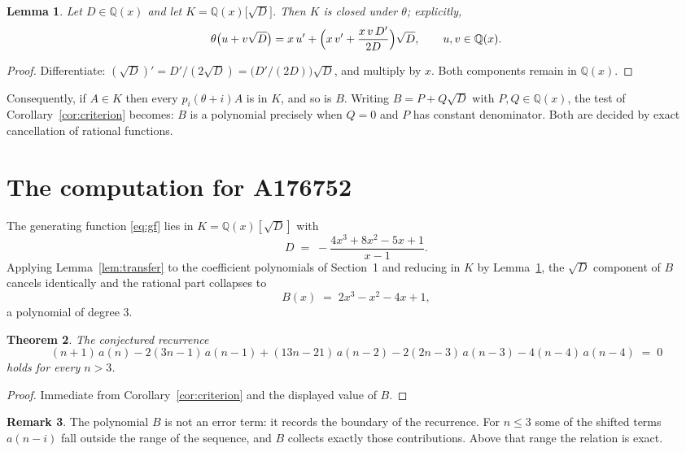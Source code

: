 \documentclass[11pt,a4paper]{article}
\theoremstyle{plain}
\newtheorem{theorem}{Theorem}
\newtheorem{lemma}[theorem]{Lemma}
\theoremstyle{definition}
\newtheorem{remark}[theorem]{Remark}
\begin{document}
\begin{lemma}\label{lem:field}
Let $D\in\mathbb{Q}(x)$ and let $K=\mathbb{Q}(x)\bigl[\sqrt{D}\bigr]$. Then $K$ is closed
under $\theta$; explicitly,
\[
\theta\bigl(u+v\sqrt{D}\bigr)=x\,u'+\Bigl(x\,v'+\frac{x\,v\,D'}{2D}\Bigr)\sqrt{D},
\qquad u,v\in\mathbb{Q}(x).
\]
\end{lemma}

\begin{proof}
Differentiate: $(\sqrt{D})'=D'/(2\sqrt{D})=\bigl(D'/(2D)\bigr)\sqrt{D}$, and multiply by
$x$. Both components remain in $\mathbb{Q}(x)$.
\end{proof}

Consequently, if $A\in K$ then every $p_{i}(\theta+i)A$ is in $K$, and so is $B$. Writing
$B=P+Q\sqrt{D}$ with $P,Q\in\mathbb{Q}(x)$, the test of Corollary~\ref{cor:criterion}
becomes: $B$ is a polynomial precisely when $Q=0$ and $P$ has constant denominator. Both
are decided by exact cancellation of rational functions.

\section{The computation for A176752}

The generating function \eqref{eq:gf} lies in $K=\mathbb{Q}(x)[\sqrt{D}]$ with
\[
D \;=\; - \frac{4 x^{3} + 8 x^{2} - 5 x + 1}{x - 1} .
\]
Applying Lemma~\ref{lem:transfer} to the coefficient polynomials of Section~1 and reducing
in $K$ by Lemma~\ref{lem:field}, the $\sqrt{D}$ component of $B$ cancels identically and
the rational part collapses to
\[
B(x)\;=\;2 x^{3} - x^{2} - 4 x + 1 ,
\]
a polynomial of degree $3$.

\begin{theorem}
The conjectured recurrence
\[
(n + 1)\,a(n) -  2 \left(3 n - 1\right)\,a(n-1) + (13 n - 21)\,a(n-2) -  2 \left(2 n - 3\right)\,a(n-3) -  4 \left(n - 4\right)\,a(n-4) \;=\;0
\]
holds for every $n>3$.
\end{theorem}

\begin{proof}
Immediate from Corollary~\ref{cor:criterion} and the displayed value of $B$.
\end{proof}

\begin{remark}
The polynomial $B$ is not an error term: it records the boundary of the recurrence. For
$n\le3$ some of the shifted terms $a(n-i)$ fall outside the range of the sequence,
and $B$ collects exactly those contributions. Above that range the relation is exact.
\end{remark}
\end{document}
